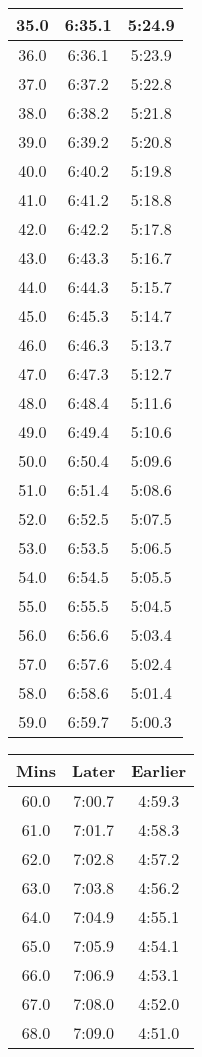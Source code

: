 \begin{footnotesize}
\begin{minipage}{0.25\textwidth}
\begin{tabular}[t]{c|c|c}
	35.0&6:35.1&5:24.9\\\hline
	36.0&6:36.1&5:23.9\\\hline
	37.0&6:37.2&5:22.8\\\hline
	38.0&6:38.2&5:21.8\\\hline
	39.0&6:39.2&5:20.8\\\hline
	40.0&6:40.2&5:19.8\\\hline
	41.0&6:41.2&5:18.8\\\hline
	42.0&6:42.2&5:17.8\\\hline
	43.0&6:43.3&5:16.7\\\hline
	44.0&6:44.3&5:15.7\\\hline
	45.0&6:45.3&5:14.7\\\hline
	46.0&6:46.3&5:13.7\\\hline
	47.0&6:47.3&5:12.7\\\hline
	48.0&6:48.4&5:11.6\\\hline
	49.0&6:49.4&5:10.6\\\hline
	50.0&6:50.4&5:09.6\\\hline
	51.0&6:51.4&5:08.6\\\hline
	52.0&6:52.5&5:07.5\\\hline
	53.0&6:53.5&5:06.5\\\hline
	54.0&6:54.5&5:05.5\\\hline
	55.0&6:55.5&5:04.5\\\hline
	56.0&6:56.6&5:03.4\\\hline
	57.0&6:57.6&5:02.4\\\hline
	58.0&6:58.6&5:01.4\\\hline
	59.0&6:59.7&5:00.3\\\hline
		\end{tabular}\end{minipage}
\begin{minipage}{0.25\textwidth}\begin{tabular}[t]{c|c|c}
			Mins&Later&Earlier\\\hline
	60.0&7:00.7&4:59.3\\\hline
		61.0&7:01.7&4:58.3\\\hline
	62.0&7:02.8&4:57.2\\\hline
	63.0&7:03.8&4:56.2\\\hline
	64.0&7:04.9&4:55.1\\\hline
	65.0&7:05.9&4:54.1\\\hline
	66.0&7:06.9&4:53.1\\\hline
	67.0&7:08.0&4:52.0\\\hline
	68.0&7:09.0&4:51.0\\\hline

\end{tabular}
\end{minipage}
\end{footnotesize}

